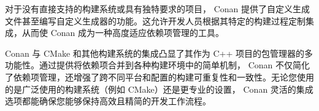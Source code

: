 
对于没有直接支持的构建系统或具有独特要求的项目， Conan 提供了自定义生成文件甚至编写自定义生成器的功能。这允许开发人员根据其特定的构建过程定制集成，从而使 Conan 成为一种高度适应依赖项管理的工具。


Conan 与 CMake 和其他构建系统的集成凸显了其作为 C++ 项目的包管理器的多功能性。通过提供将依赖项合并到各种构建环境中的简单机制， Conan 不仅简化了依赖项管理，还增强了跨不同平台和配置的构建可重复性和一致性。无论您使用的是广泛使用的构建系统（例如 CMake）还是更专业的设置， Conan 灵活的集成选项都能确保您能够保持高效且精简的开发工作流程。


